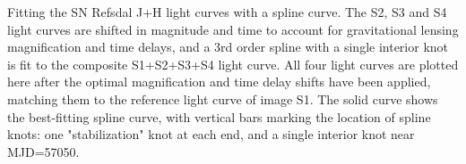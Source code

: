 \label{fig:SplineFit}
Fitting the SN Refsdal J+H light curves with a spline curve.  The S2, S3 and S4 light curves are shifted in magnitude and time to account for gravitational lensing magnification and time delays, and a 3rd order spline with a single interior knot is fit to the composite S1+S2+S3+S4 light curve.   All four light curves are plotted here after the optimal magnification and time delay shifts have been applied, matching them to the reference light curve of image S1.  The solid curve shows the best-fitting spline curve, with vertical bars marking the location of spline knots:  one "stabilization" knot at each end, and a single interior knot near MJD=57050. 